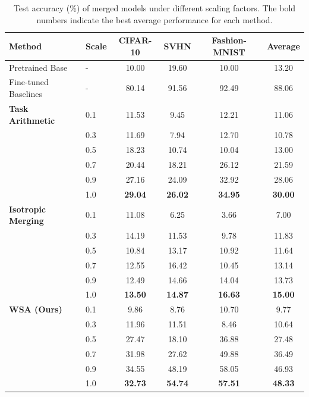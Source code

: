 \documentclass{article}
\theoremstyle{plain}
\theoremstyle{definition}
\theoremstyle{remark}
\begin{document}
\begin{table}[t]
  \caption{Test accuracy (\%) of merged models under different scaling factors. The bold numbers indicate the best average performance for each method.}
  \label{tab:results}
  \vskip 0.15in
  \begin{center}
    \begin{small}
      \begin{tabular}{llcccc}
        \toprule
        \textbf{Method} & \textbf{Scale} & \textbf{CIFAR-10} & \textbf{SVHN} & \textbf{Fashion-MNIST} & \textbf{Average} \\
        \midrule
        Pretrained Base & - & 10.00 & 19.60 & 10.00 & 13.20 \\
        Fine-tuned Baselines & - & 80.14 & 91.56 & 92.49 & 88.06 \\
        \midrule
        \textbf{Task Arithmetic} & 0.1 & 11.53 & 9.45 & 12.21 & 11.06 \\
        & 0.3 & 11.69 & 7.94 & 12.70 & 10.78 \\
        & 0.5 & 18.23 & 10.74 & 10.04 & 13.00 \\
        & 0.7 & 20.44 & 18.21 & 26.12 & 21.59 \\
        & 0.9 & 27.16 & 24.09 & 32.92 & 28.06 \\
        & 1.0 & \textbf{29.04} & \textbf{26.02} & \textbf{34.95} & \textbf{30.00} \\
        \midrule
        \textbf{Isotropic Merging} & 0.1 & 11.08 & 6.25 & 3.66 & 7.00 \\
        & 0.3 & 14.19 & 11.53 & 9.78 & 11.83 \\
        & 0.5 & 10.84 & 13.17 & 10.92 & 11.64 \\
        & 0.7 & 12.55 & 16.42 & 10.45 & 13.14 \\
        & 0.9 & 12.49 & 14.66 & 14.04 & 13.73 \\
        & 1.0 & \textbf{13.50} & \textbf{14.87} & \textbf{16.63} & \textbf{15.00} \\
        \midrule
        \textbf{WSA (Ours)} & 0.1 & 9.86 & 8.76 & 10.70 & 9.77 \\
        & 0.3 & 11.96 & 11.51 & 8.46 & 10.64 \\
        & 0.5 & 27.47 & 18.10 & 36.88 & 27.48 \\
        & 0.7 & 31.98 & 27.62 & 49.88 & 36.49 \\
        & 0.9 & 34.55 & 48.19 & 58.05 & 46.93 \\
        & 1.0 & \textbf{32.73} & \textbf{54.74} & \textbf{57.51} & \textbf{48.33} \\
        \bottomrule
      \end{tabular}
    \end{small}
  \end{center}
  \vskip -0.1in
\end{table}
\end{document}
